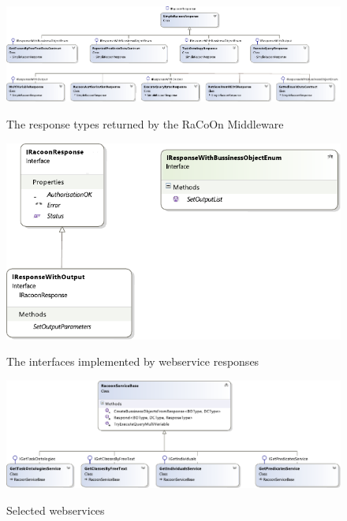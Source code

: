 \begin{figure}
\myfloatalign
{\includegraphics[width=\paperwidth]{gfx/MiddlewareServicesClassesResponseOnly}} 
\caption{The response types returned by the RaCoOn Middleware}
\label{fig:MiddlewareResponses}
\end{figure}

 \begin{figure}
\myfloatalign
{\includegraphics[width=\textwidth]{gfx/Res}} 
\caption{The interfaces implemented by webservice responses}
\label{fig:ResponseInterfaces}
\end{figure}

 \begin{figure}
\myfloatalign
{\includegraphics[width=\paperwidth]{gfx/RacoonServices}} 
\caption{Selected webservices}
\label{fig:services}
\end{figure}

